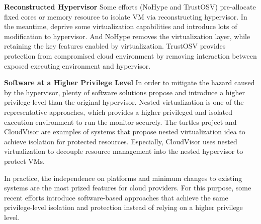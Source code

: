 \documentclass[conference]{IEEEtran}
\begin{document}
\textbf{Reconstructed Hypervisor }
Some efforts (NoHype\cite{NoHype} and TrustOSV\cite{TrustOSV}) pre-allocate fixed cores or memory resource to isolate VM via reconstructing hypervisor. In the meantime, deprive some virtualization capabilities and introduce lots of modification to hypervisor. And NoHype removes the virtualization layer, while retaining the key features enabled by virtualization. TrustOSV provides protection from compromised cloud environment by removing interaction between exposed executing environment and hypervisor.

 
\textbf{Software at a Higher Privilege Level}
In order to mitigate the hazard caused by the hypervisor, plenty of software solutions propose and introduce a higher privilege-level than the original hypervisor. Nested virtualization is one of the representative approaches, which provides a higher-privileged and isolated execution environment to run the monitor securely. The turtles project \cite{Ben2007The} and CloudVisor \cite{Zhang2011CloudVisor} are examples of systems that propose nested virtualization idea to achieve isolation for protected resources. Especially, CloudVisor uses nested virtualization to decouple resource management into the nested hypervisor to protect VMs.

In practice, the independence on platforms and minimum changes to existing systems are the most prized features for cloud providers. For this purpose,
some recent efforts introduce software-based approaches that achieve the same privilege-level isolation and protection instead of relying on a higher privilege level. 
\end{document}
